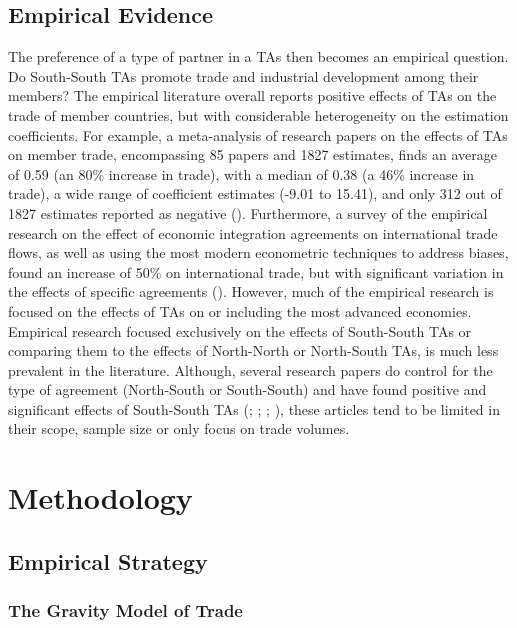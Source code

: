 \subsection{Empirical Evidence}%
\label{subsec:EmpiricalEvidence}%

%
The preference of a type of partner in a TAs then becomes an empirical
question. Do South-South TAs promote trade and industrial development
among their members? The empirical literature overall reports positive
effects of TAs on the trade of member countries, but with considerable
heterogeneity on the estimation coefficients. For example, a
meta-analysis of research papers on the effects of TAs on member trade,
encompassing 85 papers and 1827 estimates, finds an average of 0.59 (an
80\% increase in trade), with a median of 0.38 (a 46\% increase in
trade), a wide range of coefficient estimates (-9.01 to 15.41), and only
312 out of 1827 estimates reported as negative (\cite{cipollina_reciprocal_2010}). Furthermore, a survey of the empirical research on the effect of
economic integration agreements on international trade flows, as well as
using the most modern econometric techniques to address biases, found an
increase of 50\% on international trade, but with significant variation
in the effects of specific agreements (\cite{kohl_we_2014}). However, much of the
empirical research is focused on the effects of TAs on or including the
most advanced economies. Empirical research focused exclusively on the
effects of South-South TAs or comparing them to the effects of
North-North or North-South TAs, is much less prevalent in the
literature. Although, several research papers do control for the type of
agreement (North-South or South-South) and have found positive and
significant effects of South-South TAs 
(\cite{medvedev_preferential_2006}; \cite{mayda_south-south_2007}; \cite{dahi_preferential_2013}; \cite{deme_trade-creation_2017}), these
articles tend to be limited in their scope, sample size or only focus on
trade volumes.

%
\section{Methodology}%
\label{sec:Methodology}%
\subsection{Empirical Strategy}%
\label{subsec:EmpiricalStrategy}%
\subsubsection{The Gravity Model of Trade}%
\label{ssubsec:TheGravityModelofTrade}%

